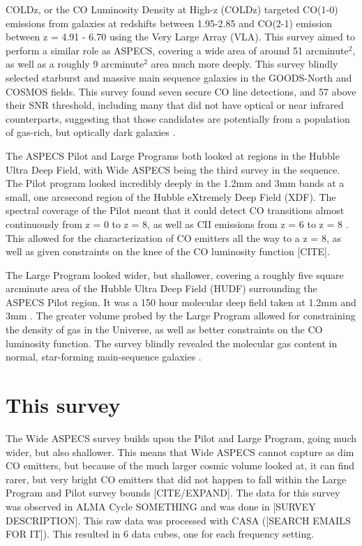 COLDz, or the CO Luminosity Density at High-z (COLDz) targeted CO(1-0) emissions from galaxies at redshifts between 1.95-2.85 and CO(2-1) emission between z = 4.91 - 6.70 using the Very Large Array (VLA)\cite{pavesi2018co}. This survey aimed to perform a similar role as ASPECS, covering a wide area of around 51 arcminute$^2$, as well as a roughly 9 arcminute$^2$ area much more deeply. This survey blindly selected starburst and massive main sequence galaxies in the GOODS-North and COSMOS fields. This survey found seven secure CO line detections, and 57 above their SNR threshold, including many that did not have optical or near infrared counterparts, suggesting that those candidates are potentially from a population of gas-rich, but optically dark galaxies \cite{pavesi2018co}.

The ASPECS Pilot and Large Programs both looked at regions in the Hubble Ultra Deep Field, with Wide ASPECS being the third survey in the sequence. The Pilot program looked incredibly deeply in the 1.2mm and 3mm bands at a small, one arcsecond region of the Hubble eXtremely Deep Field (XDF). The spectral coverage of the Pilot meant that it could detect CO transitions almost continuously from z = 0 to z = 8, as well as CII emissions from z = 6 to z = 8 \cite{walter2016alma}. This allowed for the characterization of CO emitters all the way to a z = 8, as well as given constraints on the knee of the CO luminosity function [CITE]. 

The Large Program looked wider, but shallower, covering a roughly five square arcminute area of the Hubble Ultra Deep Field (HUDF) surrounding the ASPECS Pilot region. It was a 150 hour molecular deep field taken at 1.2mm and 3mm \cite{decarli2019alma}.  The greater volume probed by the Large Program allowed for constraining the density of gas in the Universe, as well as better constraints on the CO luminosity function. The survey blindly revealed the molecular gas content in normal, star-forming main-sequence galaxies \cite{decarli2019alma}. 

\section{This survey}

The Wide ASPECS survey builds upon the Pilot and Large Program, going much wider, but also shallower. This means that Wide ASPECS cannot capture as dim CO emitters, but because of the much larger cosmic volume looked at, it can find rarer, but very bright CO emitters that did not happen to fall within the Large Program and Pilot survey bounds [CITE/EXPAND]. 
The data for this survey was observed in ALMA Cycle SOMETHING and was done in [SURVEY DESCRIPTION]. This raw data was processed with CASA ([SEARCH EMAILS FOR IT]). This resulted in 6 data cubes, one for each frequency setting. 

